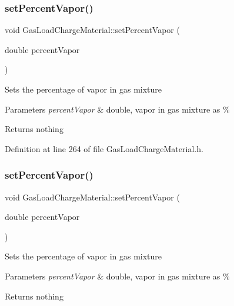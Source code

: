 \subsubsection{\texorpdfstring{set\+Percent\+Vapor()}{setPercentVapor()}\hspace{0.1cm}{\footnotesize\ttfamily [1/3]}}
{\footnotesize\ttfamily void Gas\+Load\+Charge\+Material\+::set\+Percent\+Vapor (\begin{DoxyParamCaption}\item[{double}]{percent\+Vapor }\end{DoxyParamCaption})\hspace{0.3cm}{\ttfamily [inline]}}

Sets the percentage of vapor in gas mixture


\begin{DoxyParams}{Parameters}
{\em percent\+Vapor} & double, vapor in gas mixture as \%\\
\hline
\end{DoxyParams}
\begin{DoxyReturn}{Returns}
nothing 
\end{DoxyReturn}


Definition at line 264 of file Gas\+Load\+Charge\+Material.\+h.

\mbox{\label{class_gas_load_charge_material_acace81e16ef531acb0a68462ab0ed25d}} 
\subsubsection{\texorpdfstring{set\+Percent\+Vapor()}{setPercentVapor()}\hspace{0.1cm}{\footnotesize\ttfamily [2/3]}}
{\footnotesize\ttfamily void Gas\+Load\+Charge\+Material\+::set\+Percent\+Vapor (\begin{DoxyParamCaption}\item[{double}]{percent\+Vapor }\end{DoxyParamCaption})\hspace{0.3cm}{\ttfamily [inline]}}

Sets the percentage of vapor in gas mixture


\begin{DoxyParams}{Parameters}
{\em percent\+Vapor} & double, vapor in gas mixture as \%\\
\hline
\end{DoxyParams}
\begin{DoxyReturn}{Returns}
nothing 
\end{DoxyReturn}


